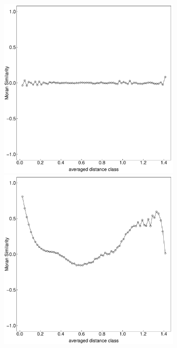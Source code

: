 \documentclass{article}
\begin{document}
\begin{figure}
\begin{subfigure}{0.3\textwidth}
	\end{subfigure}
	\begin{subfigure}{0.3\textwidth}
		\includegraphics[width=\linewidth]{figures/correlog110}\\
		\includegraphics[width=\linewidth]{figures/correlog111}\\

\end{subfigure}
\end{figure}
\end{document}

